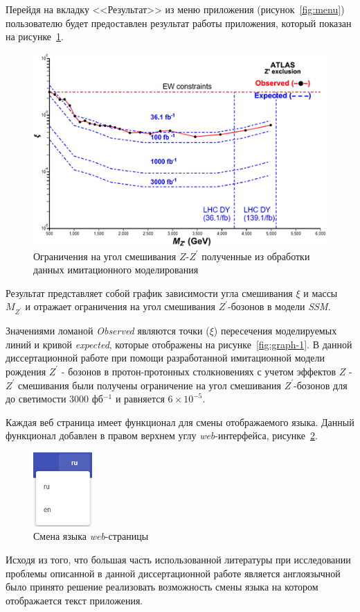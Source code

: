 Перейдя на вкладку <<Результат>> из меню приложения (рисунок~\ref{fig:menu}) пользователю будет предоставлен результат работы приложения, который показан на рисунке~\ref{fig:graph-result}.

\begin{figure}[!h]
	\centering
	\includegraphics[width=\textwidth]{figures/graph-result.png}
	\caption{Ограничения на угол смешивания $Z$-${Z}^{\prime}$ полученные из обработки данных имитационного моделирования}
	\label{fig:graph-result}
\end{figure}

Результат представляет собой график зависимости угла смешивания $\xi$ и массы ${M}_{{Z}^{\prime}}$ и отражает ограничения на угол смешивания ${Z}^{\prime}$-бозонов в модели \textit{SSM}. 

Значениями ломаной \textit{Observed} являются точки ($\xi$) пересечения моделируемых линий и кривой \textit{expected}, которые отображены на рисунке~\ref{fig:graph-1}. В данной диссертационной работе при помощи разработанной имитационной модели рождения $Z^\prime$ - бозонов в протон-протонных столкновениях с учетом эффектов $Z$ - $Z^\prime$ смешивания были получены ограничение на угол смешивания ${Z}^{\prime}$-бозонов для до светимости 3000 фб${}^{−1}$ и равняется $6\times{10}^{-5}$.

Каждая веб страница имеет функционал для смены отображаемого языка. Данный функционал добавлен в правом верхнем углу \textit{web}-интерфейса, рисунке~\ref{fig:language-switch}.

\begin{figure}[!h]
	\centering
	\includegraphics[width=0.2\textwidth]{figures/language-switch.png}
	\caption{Смена языка \textit{web}-страницы}
	\label{fig:language-switch}
\end{figure}

Исходя из того, что большая часть использованной литературы при исследовании проблемы описанной в данной диссертационной работе является англоязычной было принято решение реализовать возможность смены языка на котором отображается текст приложения.

